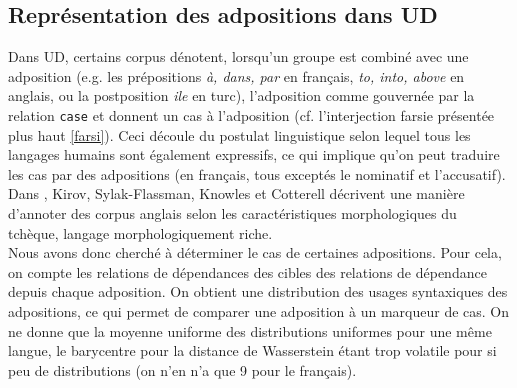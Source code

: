 \documentclass{article}
\begin{document}
\subsection{Représentation des adpositions dans UD}\label{subsec:adpos}
Dans UD, certains corpus dénotent, lorsqu'un groupe est combiné avec une adposition (e.g. les prépositions \textsl{à, dans, par} en français, \textsl{to, into, above} en anglais, ou la postposition \textsl{ile} en turc), l'adposition comme gouvernée par la relation \texttt{case} et donnent un cas à l'adposition (cf. l'interjection farsie présentée plus haut \ref{farsi}).
Ceci découle du postulat linguistique selon lequel tous les langages humains sont également expressifs, ce qui implique qu'on peut traduire les cas par des adpositions (en français, tous exceptés le nominatif et l'accusatif).
Dans \cite{morphenglish}, Kirov, Sylak-Flassman, Knowles et Cotterell décrivent une manière d'annoter des corpus anglais selon les caractéristiques morphologiques du tchèque, langage morphologiquement riche. \\
Nous avons donc cherché à déterminer le cas de certaines adpositions.
Pour cela, on compte les relations de dépendances des cibles des relations de dépendance depuis chaque adposition.
On obtient une distribution des usages syntaxiques des adpositions, ce qui permet de comparer une adposition à un marqueur de cas.
On ne donne que la moyenne uniforme des distributions uniformes pour une même langue, le barycentre pour la distance de Wasserstein étant trop volatile pour si peu de distributions (on n'en n'a que 9 pour le français).
\end{document}
